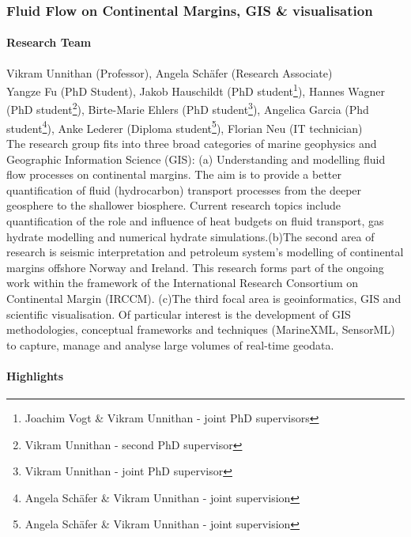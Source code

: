 \subsubsection{Fluid Flow on Continental Margins, GIS \& visualisation}

\paragraph{Research Team}
Vikram Unnithan (Professor), Angela Sch\"{a}fer (Research Associate)\\
Yangze Fu (PhD Student),
Jakob Hauschildt (PhD student\footnote{Joachim Vogt \& Vikram Unnithan - joint
PhD supervisors}), Hannes Wagner (PhD student\footnote{Vikram Unnithan - second
PhD supervisor}), Birte-Marie Ehlers (PhD student\footnote{Vikram Unnithan - joint PhD
supervisor}), Angelica Garcia (Phd student\footnote{Angela Sch\"{a}fer \&
Vikram Unnithan - joint supervision}),  Anke Lederer (Diploma student\footnote{Angela Sch\"{a}fer \&
Vikram Unnithan - joint supervision}), Florian Neu (IT technician) \\

The research group fits into three broad categories of marine geophysics and Geographic Information Science (GIS):
(a) Understanding and modelling fluid flow processes on continental margins. The aim is to provide a better
quantification of fluid (hydrocarbon) transport processes from the deeper geosphere to the shallower biosphere.
Current research topics include quantification of the role and influence of heat budgets on fluid transport,
gas hydrate modelling and numerical hydrate simulations.(b)The second area of research is seismic interpretation
and petroleum system's modelling of continental margins offshore Norway and Ireland. This research forms part
of the ongoing work within the framework of the International Research Consortium on Continental Margin (IRCCM). (c)The
third focal area is geoinformatics, GIS and scientific visualisation. Of particular interest is the  development
 of GIS methodologies, conceptual frameworks and techniques (MarineXML, SensorML) to capture, manage and analyse large volumes of real-time geodata.


\paragraph{Highlights}




